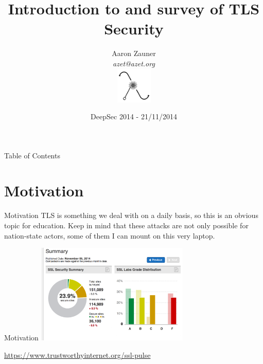 \documentclass[hyperref={draft}]{beamer}
\title{Introduction to and survey of TLS Security}
\author[Aaron Zauner]{Aaron Zauner\\
	      \textit{azet@azet.org}\\
	      \includegraphics[height=65px,width=65px]{lambda}
       }
\institute{lambda.co.at:\\Highly-Available, Scalable \& Secure Distributed Systems}
\date{DeepSec 2014 - 21/11/2014}
\begin{document}
{

\begin{frame}
  \titlepage
\end{frame}

}
\addtocounter{framenumber}{-1}

{

\begin{frame}{Table of Contents}
  \tableofcontents
\end{frame}

}
\addtocounter{framenumber}{-1}




\section{Motivation}

\begin{frame}{Motivation}
  TLS is something we deal with on a daily basis, so this is an obvious topic for education.
  \newline
  \newline
  Keep in mind that these attacks are not only possible for nation-state actors, some of them I can mount on this very laptop.
\end{frame}

\begin{frame}{Motivation}
    \includegraphics[height=180px]{sslpulse1}

    \vspace{10px}

    \tiny
    \url{https://www.trustworthyinternet.org/ssl-pulse}
\end{frame}
\end{document}
